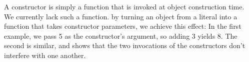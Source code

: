 
A constructor is simply a function that is invoked at object construction time.
We currently lack such a function. by turning an object from a literal into a
function that takes constructor parameters, we achieve this effect:
In the first example, we pass 5 as the constructor’s argument, so adding 3
yields 8. The second is similar, and shows that the two invocations of the
constructors don’t interfere with one another.
